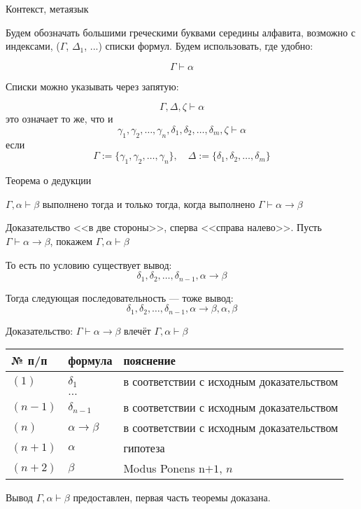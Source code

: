 \documentclass[aspectratio=169]{beamer}
\begin{document}
\begin{frame}{Контекст, метаязык}

Будем обозначать большими греческими буквами середины
алфавита, возможно с индексами, ($\Gamma$, $\Delta_1$, ...) списки формул.
Будем использовать, где удобно:

$$\Gamma \vdash \alpha$$\pause

Списки можно указывать через запятую:

$$\Gamma, \Delta, \zeta \vdash \alpha$$\pause
это означает то же, что и 
$$\gamma_1,\gamma_2,\dots,\gamma_n,\delta_1,\delta_2,\dots,\delta_m,\zeta\vdash\alpha$$
если 
$$\Gamma := \{\gamma_1,\gamma_2,\dots,\gamma_n\},\quad \Delta := \{\delta_1,\delta_2,\dots,\delta_m\}$$

\end{frame}

\begin{frame}{Теорема о дедукции}

\begin{theorem}
$\Gamma,\alpha\vdash\beta$ выполнено тогда и только тогда, когда выполнено $\Gamma\vdash\alpha\rightarrow\beta$
\end{theorem}\pause

\vspace{0.5cm}
Доказательство <<в две стороны>>, сперва <<справа налево>>.
Пусть $\Gamma\vdash\alpha\rightarrow\beta$, покажем $\Gamma,\alpha\vdash\beta$\pause\vspace{0.5cm}

То есть по условию существует вывод: $$\delta_1, \delta_2, \dots, \delta_{n-1}, \alpha\rightarrow\beta$$\pause

Тогда следующая последовательность --- тоже вывод: 
$$\delta_1, \delta_2, \dots, \delta_{n-1}, \alpha\rightarrow\beta, \alpha, \beta$$


\end{frame}

\begin{frame}{Доказательство: $\Gamma\vdash\alpha\rightarrow\beta$ влечёт $\Gamma,\alpha\vdash\beta$}
\begin{tabular}{lll}
№ п/п & формула & пояснение\\
\hline
$(1)$ & $\delta_1$ & в соответствии с исходным доказательством\\
    & $\dots$ \\
$(n-1)$ & $\delta_{n-1}$ & в соответствии с исходным доказательством\\
$(n)$ & $\alpha\rightarrow\beta $ & в соответствии с исходным доказательством\\
$(n+1)$ & $\alpha$ & гипотеза\\
$(n+2)$ & $\beta$ & Modus Ponens n$+1$, $n$
\end{tabular}\pause\vspace{1cm}

Вывод $\Gamma,\alpha\vdash\beta$ предоставлен, первая часть теоремы доказана.
\end{frame}
\end{document}
